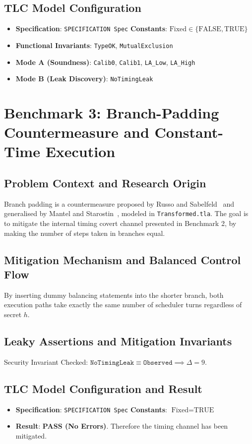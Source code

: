 \documentclass[a4paper,12pt]{report}
\begin{document}
\subsection{TLC Model Configuration}
\begin{itemize}[itemsep=0.08em, topsep=0.08em]
    \item \textbf{Specification}: \texttt{SPECIFICATION Spec} \quad \textbf{Constants}: $\text{Fixed} \in \{\text{FALSE}, \text{TRUE}\}$
    \item \textbf{Functional Invariants}: \texttt{TypeOK}, \texttt{MutualExclusion}
    \item \textbf{Mode A (Soundness)}: \texttt{Calib0}, \texttt{Calib1}, \texttt{LA\_Low}, \texttt{LA\_High}
    \item \textbf{Mode B (Leak Discovery)}: \texttt{NoTimingLeak}
\end{itemize}

\section{Benchmark 3: Branch-Padding Countermeasure and Constant-Time Execution}

\subsection{Problem Context and Research Origin}
Branch padding is a countermeasure proposed by Russo and Sabelfeld~\cite{russo2006closing} and generalised by Mantel and Starostin~\cite{mantel2015timing}, modeled in \texttt{Transformed.tla}. The goal is to mitigate the internal timing covert channel presented in Benchmark 2, by making the number of steps taken in branches equal.

\subsection{Mitigation Mechanism and Balanced Control Flow}
By inserting dummy balancing statements into the shorter branch, both execution paths take exactly the same number of scheduler turns regardless of secret $h$.

\subsection{Leaky Assertions and Mitigation Invariants}
Security Invariant Checked: $\texttt{NoTimingLeak} \equiv \texttt{Observed} \implies \Delta = 9$.

\subsection{TLC Model Configuration and Result}
\begin{itemize}[itemsep=0.08em, topsep=0.08em]
    \item \textbf{Specification}: \texttt{SPECIFICATION Spec} \quad \textbf{Constants}: $\text{Fixed} = \text{TRUE}$
    \item \textbf{Result}: \textbf{PASS (No Errors)}. Therefore the timing channel has been mitigated.
\end{itemize}
\end{document}
